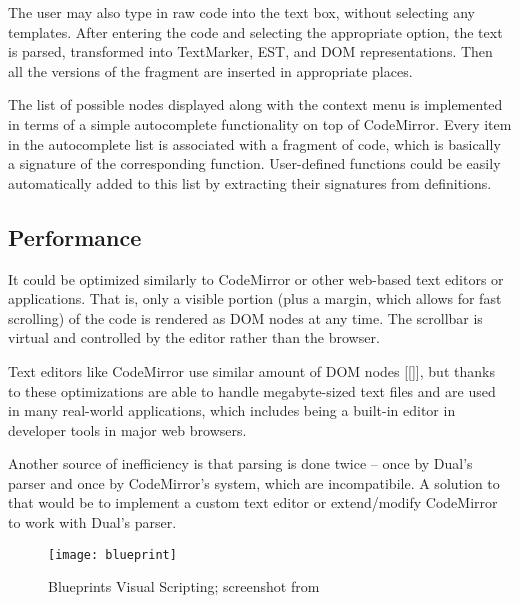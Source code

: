 The user may also type in raw code into the text box, without selecting any templates. After entering the code and selecting the appropriate option, the text is parsed, transformed into TextMarker, EST, and DOM representations. Then all the versions of the fragment are inserted in appropriate places.

The list of possible nodes displayed along with the context menu is implemented
in terms of a simple autocomplete functionality on top of CodeMirror. Every item
in the autocomplete list is associated with a fragment of code, which is
basically a signature of the corresponding function. User-defined functions
could be easily automatically added to this list by extracting their signatures
from definitions.


\subsection{Performance}
It could be optimized similarly to CodeMirror or other web-based text editors or
applications. That is, only a visible portion (plus a margin, which allows for
fast scrolling) of the code is rendered as DOM nodes at any time. The scrollbar
is virtual and controlled by the editor rather than the browser.

Text editors like CodeMirror use similar amount of DOM nodes [[]], but thanks to
these optimizations are able to handle
megabyte-sized\cite[Section~General Approach]{cm_internals}
text files and are used in many real-world
applications\cite{cm_realworld}, which
includes being a built-in editor in developer tools in major web browsers.

Another source of inefficiency is that parsing is done twice -- once by Dual's
parser and once by CodeMirror's system, which are incompatibile.  A solution to
that would be to implement a custom text editor or extend/modify CodeMirror to
work with Dual's parser.


\begin{figure}[h!]
\centering \texttt{[image: blueprint]}
\caption{
    Blueprints Visual Scripting;
    screenshot from \protect\cite{fig_blueprint2}
}
\label{fig:blueprint2}
\end{figure}


